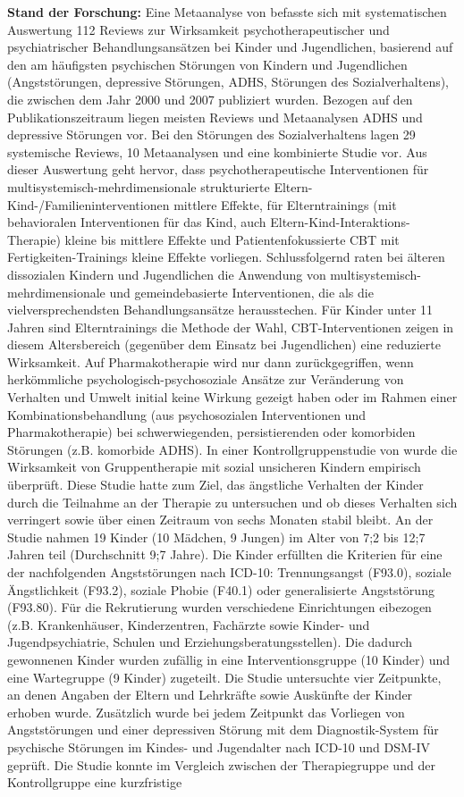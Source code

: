\textbf{Stand der Forschung:} Eine Metaanalyse von  befasste sich mit systematischen Auswertung 112 Reviews zur Wirksamkeit psychotherapeutischer und psychiatrischer Behandlungsansätzen bei Kinder und Jugendlichen,
basierend auf den am häufigsten psychischen Störungen von Kindern und Jugendlichen (Angststörungen, depressive Störungen,
ADHS, Störungen des Sozialverhaltens), die zwischen dem Jahr 2000 und 2007 publiziert wurden. Bezogen auf den Publikationszeitraum liegen meisten Reviews und Metaanalysen ADHS und depressive Störungen vor. Bei den Störungen des Sozialverhaltens lagen 29 systemische Reviews, 10 Metaanalysen und eine kombinierte Studie vor. Aus dieser Auswertung geht hervor, dass psychotherapeutische Interventionen für multisystemisch-mehrdimensionale strukturierte Eltern-Kind-/Familieninterventionen mittlere Effekte, für Elterntrainings (mit behavioralen Interventionen für das Kind, auch Eltern-Kind-Interaktions-Therapie) kleine bis mittlere Effekte und Patientenfokussierte CBT mit Fertigkeiten-Trainings kleine Effekte vorliegen. Schlussfolgernd raten  bei älteren dissozialen Kindern und Jugendlichen die Anwendung von multisystemisch-mehrdimensionale und gemeindebasierte Interventionen, die als die vielversprechendsten Behandlungsansätze herausstechen. Für Kinder unter 11 Jahren sind Elterntrainings die Methode der Wahl, CBT-Interventionen zeigen in diesem Altersbereich (gegenüber dem Einsatz bei Jugendlichen) eine reduzierte Wirksamkeit. Auf Pharmakotherapie wird nur dann zurückgegriffen, wenn herkömmliche psychologisch-psychosoziale Ansätze zur Veränderung von Verhalten und Umwelt initial keine Wirkung gezeigt haben oder im Rahmen einer Kombinationsbehandlung (aus psychosozialen Interventionen und Pharmakotherapie) bei schwerwiegenden, persistierenden oder komorbiden Störungen (z.B. komorbide ADHS). In einer Kontrollgruppenstudie von  wurde die Wirksamkeit von Gruppentherapie mit sozial unsicheren Kindern empirisch überprüft. Diese Studie hatte zum Ziel, das ängstliche Verhalten der Kinder durch die Teilnahme an der Therapie zu untersuchen und ob dieses Verhalten sich verringert sowie über einen Zeitraum von sechs Monaten stabil bleibt. An der Studie nahmen 19 Kinder (10 Mädchen, 9 Jungen) im Alter von 7;2 bis 12;7 Jahren teil (Durchschnitt 9;7 Jahre). Die Kinder erfüllten die Kriterien für eine der nachfolgenden Angststörungen nach ICD-10: Trennungsangst (F93.0), soziale Ängstlichkeit (F93.2), soziale Phobie (F40.1) oder generalisierte Angststörung (F93.80). Für die Rekrutierung wurden verschiedene Einrichtungen eibezogen (z.B. Krankenhäuser, Kinderzentren, Fachärzte sowie Kinder- und Jugendpsychiatrie, Schulen und Erziehungsberatungsstellen). Die dadurch gewonnenen Kinder wurden zufällig in eine Interventionsgruppe (10 Kinder) und eine Wartegruppe (9 Kinder) zugeteilt. Die Studie untersuchte vier Zeitpunkte, an denen Angaben der Eltern und Lehrkräfte sowie Auskünfte der Kinder erhoben wurde. Zusätzlich wurde bei jedem Zeitpunkt das Vorliegen von Angststörungen und einer depressiven Störung mit dem Diagnostik-System für psychische Störungen im Kindes- und Jugendalter nach ICD-10 und DSM-IV geprüft. Die Studie konnte im Vergleich zwischen der Therapiegruppe und der Kontrollgruppe eine kurzfristige 